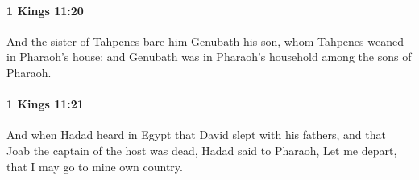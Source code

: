 		\paragraph{1 Kings 11:20} %
			\label{1KINGS-11-20}

			And the sister of Tahpenes bare him Genubath his son, whom Tahpenes weaned in Pharaoh’s house: and Genubath was in Pharaoh’s household among the sons of Pharaoh.


		\paragraph{1 Kings 11:21} %
			\label{1KINGS-11-21}

			And when Hadad heard in Egypt that David slept with his fathers, and that Joab the captain of the host was dead, Hadad said to Pharaoh, Let me depart, that I may go to mine own country.


